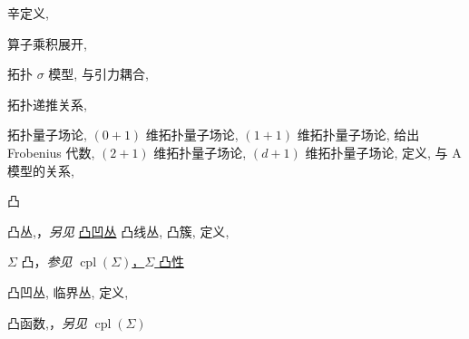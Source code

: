 \begin{theindex}
\subitem \leavevmode\hypertarget{idx:0635}{辛定义},\enspace{}
\indexspace
\item \leavevmode\hypertarget{idx:0989}{算子乘积展开},\enspace{}
\indexspace
\item \leavevmode\hypertarget{idx:1345}{拓扑 $\sigma$ 模型},\enspace{}
\subitem \leavevmode\hypertarget{idx:1346}{与引力耦合},\enspace{}
\indexspace
\item \leavevmode\hypertarget{idx:1344}{拓扑递推关系},\enspace{}
\indexspace
\item \leavevmode\hypertarget{idx:1336}{拓扑量子场论},\enspace{}
\subitem \leavevmode\hypertarget{idx:1337}{$(0+1)$ 维拓扑量子场论},\enspace{}
\subitem \leavevmode\hypertarget{idx:1338}{$(1+1)$ 维拓扑量子场论},\enspace{}
\subsubitem \leavevmode\hypertarget{idx:1339}{给出 Frobenius 代数},\enspace{}
\subitem \leavevmode\hypertarget{idx:1340}{$(2+1)$ 维拓扑量子场论},\enspace{}
\subitem \leavevmode\hypertarget{idx:1341}{$(d+1)$ 维拓扑量子场论},\enspace{}
\subitem \leavevmode\hypertarget{idx:1342}{定义},\enspace{}
\subitem \leavevmode\hypertarget{idx:1343}{与 A 模型的关系},\enspace{}
\indexspace
\item \leavevmode\hypertarget{idx:0176}{凸}
\subitem \leavevmode\hypertarget{idx:0177}{凸丛},\enspace{}，\textit{另见} \hyperlink{idx:0146}{凸凹丛}
\subitem \leavevmode\hypertarget{idx:0178}{凸线丛},\enspace{}
\subitem \leavevmode\hypertarget{idx:0179}{凸簇},\enspace{}
\subsubitem \leavevmode\hypertarget{idx:0180}{定义},\enspace{}
\indexspace
\item \leavevmode\hypertarget{idx:1248}{$\Sigma$ 凸}，\textit{参见} \hyperlink{idx:0202}{$\operatorname{cpl}(\Sigma)$，$\Sigma$ 凸性}
\indexspace
\item \leavevmode\hypertarget{idx:0146}{凸凹丛},\enspace{}
\subitem \leavevmode\hypertarget{idx:0147}{临界丛},\enspace{}
\subsubitem \leavevmode\hypertarget{idx:0148}{定义},\enspace{}
\indexspace
\item \leavevmode\hypertarget{idx:0181}{凸函数},\enspace{}，\textit{另见} \hyperlink{idx:0199}{$\operatorname{cpl}(\Sigma)$}

\end{theindex}
